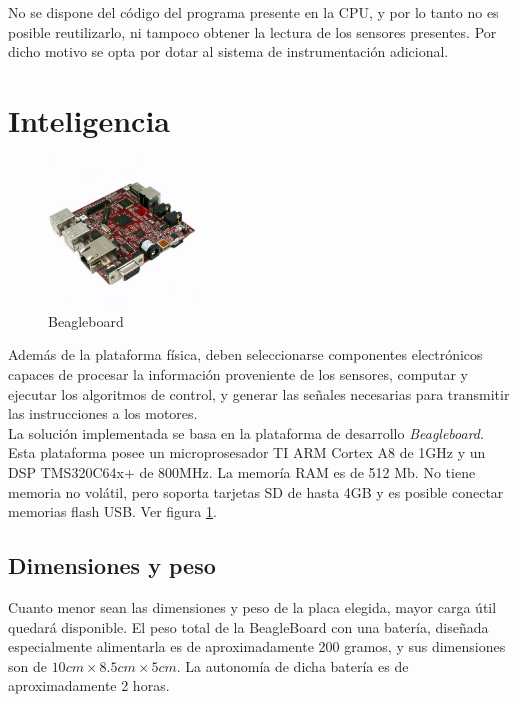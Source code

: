 \documentclass[main]{subfiles}
\begin{document}
No se dispone del c\'odigo del programa presente en la CPU, y por lo tanto no es posible reutilizarlo, ni tampoco obtener la lectura de los sensores presentes. Por dicho motivo se opta por dotar al sistema de instrumentaci\'on adicional. 

\section{Inteligencia}

\begin{figure}
\vspace{-30pt}
	\centering
	\includegraphics[width=0.35\textwidth]{./pics_eleccion_hardware/beagle.pdf}
\vspace{-30pt}
	\caption{Beagleboard}
	\label{fig:beagleboard}
\end{figure}

Adem\'as de la plataforma f\'isica, deben seleccionarse componentes electr\'onicos capaces de procesar la informaci\'on proveniente de los sensores, computar y ejecutar los algoritmos de control, y generar las se\~nales necesarias para transmitir las instrucciones a los motores.\\

La soluci\'on implementada se basa en la plataforma de desarrollo \emph{Beagleboard}. Esta plataforma posee un microprosesador TI ARM Cortex A8 de 1GHz y un DSP TMS320C64x+ de 800MHz. La memor\'ia RAM es de 512 Mb. No tiene memoria no vol\'atil, pero soporta tarjetas SD de hasta 4GB y es posible conectar memorias flash USB. Ver figura \ref{fig:beagleboard}.

\subsection*{Dimensiones y peso}

Cuanto menor sean las dimensiones y peso de la placa elegida, mayor carga \'util quedar\'a disponible. El peso total de la BeagleBoard con una bater\'ia, diseñada especialmente alimentarla es de aproximadamente 200 gramos, y sus dimensiones son de $10cm\times8.5cm\times5cm$. La autonom\'ia de dicha bater\'ia es de aproximadamente 2 horas.
\end{document}
